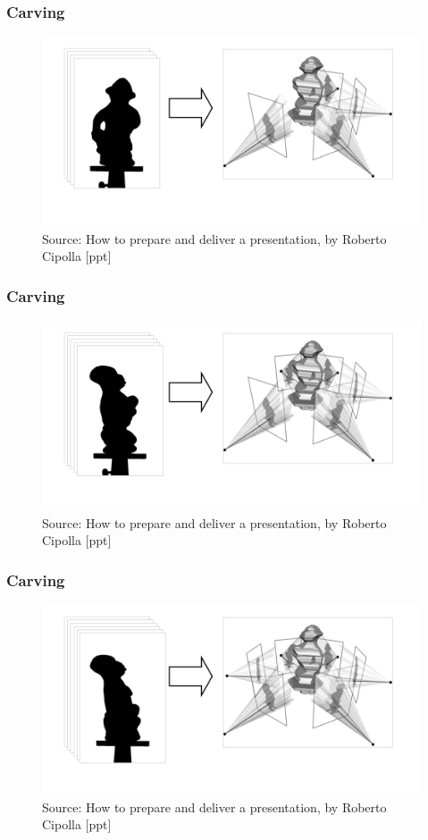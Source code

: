 \documentclass{beamer}
\begin{document}
\begin{frame}
  \frametitle{Carving}
  \begin{figure}[htb!]
   \centering
   \includegraphics[width=1.0\textwidth]{img/carving4}
   \caption*{\tiny Source: How to prepare and deliver a presentation, by Roberto Cipolla [ppt]}
   \label{fig:carving4}
  \end{figure}
\end{frame}
\begin{frame}
  \frametitle{Carving}
  \begin{figure}[htb!]
   \centering
   \includegraphics[width=1.0\textwidth]{img/carving5}
   \caption*{\tiny Source: How to prepare and deliver a presentation, by Roberto Cipolla [ppt]}
   \label{fig:carving5}
  \end{figure}
\end{frame}
\begin{frame}
  \frametitle{Carving}
  \begin{figure}[htb!]
   \centering
   \includegraphics[width=1.0\textwidth]{img/carving6}
   \caption*{\tiny Source: How to prepare and deliver a presentation, by Roberto Cipolla [ppt]}
   \label{fig:carving6}
  \end{figure}
\end{frame}
\end{document}
